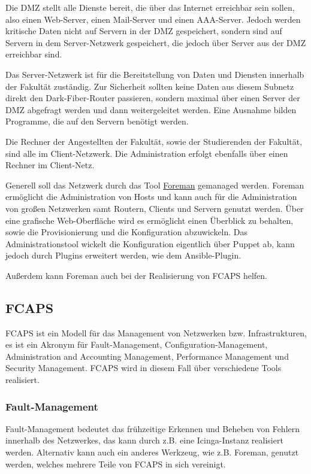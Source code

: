 \documentclass[a4paper]{article}
\begin{document}
Die DMZ stellt alle Dienste bereit, die über das Internet erreichbar sein sollen, also einen Web-Server, einen Mail-Server und einen AAA-Server. Jedoch werden kritische Daten nicht auf Servern in der DMZ gespeichert, sondern sind auf Servern in dem Server-Netzwerk gespeichert, die jedoch über Server aus der DMZ erreichbar sind.

Das Server-Netzwerk ist für die Bereitstellung von Daten und Diensten innerhalb der Fakultät zuständig. Zur Sicherheit sollten keine Daten aus diesem Subnetz direkt den Dark-Fiber-Router passieren, sondern maximal über einen Server der DMZ abgefragt werden und dann weitergeleitet werden. Eine Ausnahme bilden Programme, die auf den Servern benötigt werden.

Die Rechner der Angestellten der Fakultät, sowie der Studierenden der Fakultät, sind alle im Client-Netzwerk. Die Administration erfolgt ebenfalls über einen Rechner im Client-Netz.

Generell soll das Netzwerk durch das Tool \href{www.theforeman.org}{Foreman} gemanaged werden. Foreman ermöglicht die Administration von Hosts und kann auch für die Administration von großen Netzwerken samt Routern, Clients und Servern genutzt werden. Über eine grafische Web-Oberfläche wird es ermöglicht einen Überblick zu behalten, sowie die Provisionierung und die Konfiguration abzuwickeln.
Das Administrationstool wickelt die Konfiguration eigentlich über Puppet ab, kann jedoch durch Plugins erweitert werden, wie dem Ansible-Plugin. 

Außerdem kann Foreman auch bei der Realisierung von FCAPS helfen.

\subsection{FCAPS}
FCAPS ist ein Modell für das Management von Netzwerken bzw. Infrastrukturen, es ist ein Akronym für Fault-Management, Configuration-Management, Administration and Accounting Management, Performance Management und Security Management. FCAPS wird in diesem Fall über verschiedene Tools realisiert.


\subsubsection{Fault-Management}
Fault-Management bedeutet das frühzeitige Erkennen und Beheben von Fehlern innerhalb des Netzwerkes, das kann durch z.B. eine Icinga-Instanz realisiert werden. Alternativ kann auch ein anderes Werkzeug, wie z.B. Foreman, genutzt werden, welches mehrere Teile von FCAPS in sich vereinigt.
\end{document}
